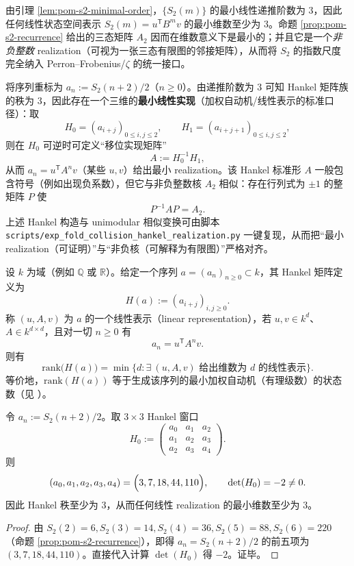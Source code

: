 \begin{remark}\label{rem:pom-s2-minimal-realization}
由引理 \ref{lem:pom-s2-minimal-order}，\(\{S_2(m)\}\) 的最小线性递推阶数为 \(3\)，因此任何线性状态空间表示 \(S_2(m)=u^{\mathsf T}B^{m}v\) 的最小维数至少为 \(3\)。命题 \ref{prop:pom-s2-recurrence} 给出的三态矩阵 \(A_2\) 因而在维数意义下是最小的；并且它是一个\emph{非负整数} realization（可视为一张三态有限图的邻接矩阵），从而将 \(S_2\) 的指数尺度完全纳入 Perron--Frobenius/\(\zeta\) 的统一接口。
\end{remark}

\begin{remark}\label{rem:pom-s2-hankel}
将序列重标为 \(a_n:=S_2(n+2)/2\)（\(n\ge 0\)）。由递推阶数为 \(3\) 可知 Hankel 矩阵族的秩为 \(3\)，因此存在一个三维的\textbf{最小线性实现}（加权自动机/线性表示的标准口径）：取
$$
H_0=(a_{i+j})_{0\le i,j\le 2},\qquad H_1=(a_{i+j+1})_{0\le i,j\le 2},
$$
则在 \(H_0\) 可逆时可定义“移位实现矩阵”
$$
A:=H_0^{-1}H_1,
$$
从而 \(a_n=u^{\mathsf T}A^{n}v\)（某些 \(u,v\)）给出最小 realization。该 Hankel 标准形 \(A\) 一般包含符号（例如出现负系数），但它与非负整数核 \(A_2\) 相似：存在行列式为 \(\pm 1\) 的整矩阵 \(P\) 使
$$
P^{-1}AP=A_2.
$$
上述 Hankel 构造与 unimodular 相似变换可由脚本 \texttt{scripts/exp\_fold\_collision\_hankel\_realization.py} 一键复现，从而把“最小 realization（可证明）”与“非负核（可解释为有限图）”严格对齐。
\end{remark}

\begin{theorem}\label{thm:hankel-rank-minimal}
设 \(k\) 为域（例如 \(\mathbb{Q}\) 或 \(\mathbb{R}\)）。给定一个序列 \(a=(a_n)_{n\ge 0}\subset k\)，其 Hankel 矩阵定义为
$$
H(a):=(a_{i+j})_{i,j\ge 0}.
$$
称 \((u,A,v)\) 为 \(a\) 的一个线性表示（linear representation），若 \(u,v\in k^d\)、\(A\in k^{d\times d}\)，且对一切 \(n\ge 0\) 有
$$
a_n=u^{\mathsf T}A^n v.
$$
则有
$$
\mathrm{rank}\bigl(H(a)\bigr)=\min\{d:\exists\ (u,A,v)\text{ 给出维数为 }d\text{ 的线性表示}\}.
$$
等价地，\(\mathrm{rank}(H(a))\) 等于生成该序列的最小加权自动机（有理级数）的状态数（见 \cite{BerstelReutenauer1988RationalSeries}）。
\end{theorem}

\begin{lemma}\label{lem:pom-s2-hankel-det}
令 \(a_n:=S_2(n+2)/2\)。取 \(3\times 3\) Hankel 窗口
$$
H_0:=
\begin{pmatrix}
a_0 & a_1 & a_2\\
a_1 & a_2 & a_3\\
a_2 & a_3 & a_4
\end{pmatrix}.
$$
则
$$
(a_0,a_1,a_2,a_3,a_4)=\Bigl(3,7,18,44,110\Bigr),
\qquad
\det(H_0)=-2\neq 0.
$$
因此 Hankel 秩至少为 \(3\)，从而任何线性 realization 的最小维数至少为 \(3\)。
\end{lemma}
\begin{proof}
由 \(S_2(2)=6,S_2(3)=14,S_2(4)=36,S_2(5)=88,S_2(6)=220\)（命题 \ref{prop:pom-s2-recurrence}），即得
\(
a_n=S_2(n+2)/2
\)
的前五项为 \((3,7,18,44,110)\)。直接代入计算 \(\det(H_0)\) 得 \(-2\)。证毕。
\end{proof}

